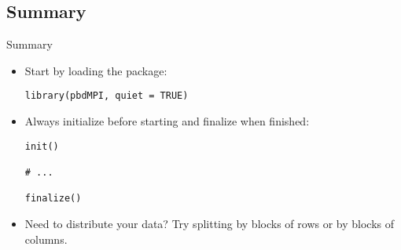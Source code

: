\subsection{Summary}
\makesubcontentsslidessec


\begin{frame}[fragile]
  \begin{block}{Summary}\pause
    \begin{itemize}
    \item Start by loading the package:
      \vspace{-.4cm}
      \begin{lstlisting}
library(pbdMPI, quiet = TRUE)
      \end{lstlisting}
    \item Always initialize before starting and finalize when finished:
      \vspace{-.4cm}
      \begin{lstlisting}
init()

# ...

finalize()
      \end{lstlisting}
    \item Need to distribute your data? Try splitting by blocks of
      rows or by blocks of columns.
    \end{itemize}
  \end{block}
\end{frame}